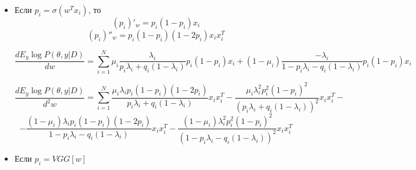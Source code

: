 \documentclass[12 pt]{article}
\begin{document}
\begin{itemize}
\item  Если $p_i = \sigma(w^T x_i)$,  то 
\[(p_i)'_{w} = p_i(1 - p_i)x_i\]
\[(p_i)''_{w} = p_i(1 - p_i)(1 - 2p_i)x_ix_i^T\]

\[\frac{d E_y \log P(\theta, y | D)}{d w} = \sum\limits_{i = 1}^N \mu_i\frac{\lambda_i}{p_i\lambda_i + q_i(1 - \lambda_i)}p_i(1 - p_i)x_i + (1 - \mu_i)\frac{-\lambda_i}{1 - p_i\lambda_i - q_i(1 - \lambda_i)}p_i(1 - p_i)x_i\]

\[\frac{d E_y \log P(\theta, y | D)}{d^2 w} = \sum\limits_{i = 1}^N \frac{\mu_i\lambda_i p_i(1 - p_i)(1 - 2p_i)}{p_i\lambda_i + q_i(1 - \lambda_i)}x_ix_i^T - \frac{\mu_i\lambda_i^2p_i^2(1 - p_i)^2}{(p_i\lambda_i + q_i(1 - \lambda_i))^2}x_ix_i^T - \]
\[ - \frac{(1 - \mu_i)\lambda_ip_i(1 - p_i)(1 - 2p_i)}{1 - p_i\lambda_i - q_i(1 - \lambda_i)}x_ix_i^T - \frac{(1 - \mu_i)\lambda_i^2p_i^2(1 - p_i)^2}{(1 - p_i\lambda_i - q_i(1 - \lambda_i))^2}x_ix_i^T\]

\item Если $p_i = VGG[w]$

\end{itemize}
\end{document}
